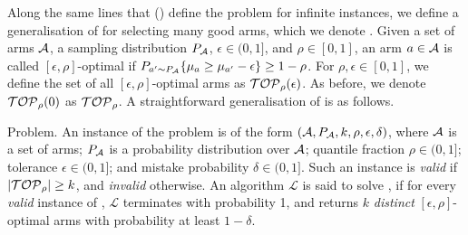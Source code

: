 Along the same lines that \citeauthor{bib:arcsk2017} (\citeyear{bib:arcsk2017}) define the \QP problem for infinite instances, we define a generalisation of \QP for selecting many good arms, which we denote \QPK. Given a set of arms $\mathcal{A}$, a sampling
distribution $P_{\mathcal{A}}$, $\epsilon \in (0,1]$, and $\rho \in [0, 1]$, an arm $a \in \mathcal{A}$
is called $[\epsilon, \rho]$-optimal if
$P_{a' \sim P_{\mathcal{A}}} \{\mu_a \geq \mu_{a'} -\epsilon\} \geq 1 - \rho$. For $\rho, \epsilon \in [0,1]$, we define the set of all $[\epsilon, \rho]$-optimal arms as
${\mathcal{TOP}_\rho}(\epsilon)$. As before, we denote ${\mathcal{TOP}_\rho}(0)$ as ${\mathcal{TOP}_\rho}$.
A straightforward generalisation of \QP is as follows.

\begin{definition}{\QPK Problem.}
An instance of the \QPK problem
is of the form $(\mathcal{A}, P_{\mathcal{A}}, k, \rho, \epsilon, \delta)$, where $\mathcal{A}$ is a set of arms; $P_{\mathcal{A}}$ is a probability distribution 
over $\mathcal{A}$; quantile fraction $\rho \in (0, 1]$; tolerance $\epsilon \in (0, 1]$; and mistake probability $\delta \in (0,1]$. Such an instance is \emph{valid} if $|{\mathcal{TOP}_\rho}| \geq k$, and \textit{invalid} otherwise.
An algorithm $\mathcal{L}$ is said to solve
\QPK, if for every \emph{valid} instance of \QPK, $\mathcal{L}$ terminates
with probability 1, and returns $k$ \emph{distinct} $[\epsilon, \rho]$-optimal arms with probability
at least $1-\delta$.
\end{definition}

